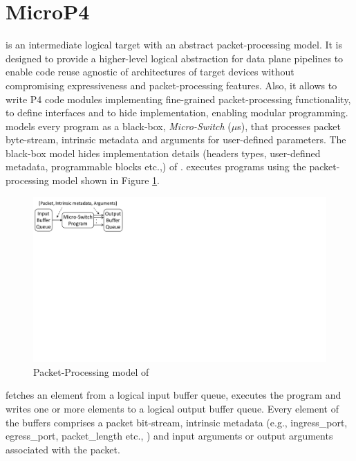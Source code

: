 \documentclass[letterpaper,twocolumn,10pt]{article}
\begin{document}
\section{MicroP4}
\label{sec:microp4}
\uswitch is an intermediate logical target with an abstract packet-processing model.
It is designed to provide a higher-level logical abstraction for data plane pipelines to enable code reuse agnostic of architectures of target devices without compromising expressiveness and packet-processing features.
Also, it allows to write P4 code modules implementing fine-grained packet-processing functionality, to define interfaces and to hide implementation, enabling modular programming.
\uswitch models every program as a black-box, \emph{Micro-Switch} ($\mu$s), that processes packet byte-stream, intrinsic metadata and arguments for user-defined parameters.
The black-box model hides implementation details (headers types, user-defined metadata, programmable blocks etc.,) of \uprograms.
\uswitch executes programs using the packet-processing model shown in Figure \ref{fig:mp4-packet-processing-model}.
\begin{figure}[h]
    \centering
    \includegraphics[trim=0 420 667 0, clip, scale=0.5]{microp4-program-model}
    \caption{Packet-Processing model of \uprograms}
    \label{fig:mp4-packet-processing-model}
\end{figure}
\uswitch fetches an element from a logical input buffer queue, executes the program and writes one or more elements to a logical output buffer queue.
Every element of the buffers comprises a packet bit-stream, intrinsic metadata (e.g., ingress\_port, egress\_port, packet\_length etc., ) and input arguments or output arguments associated with the packet.
\end{document}
